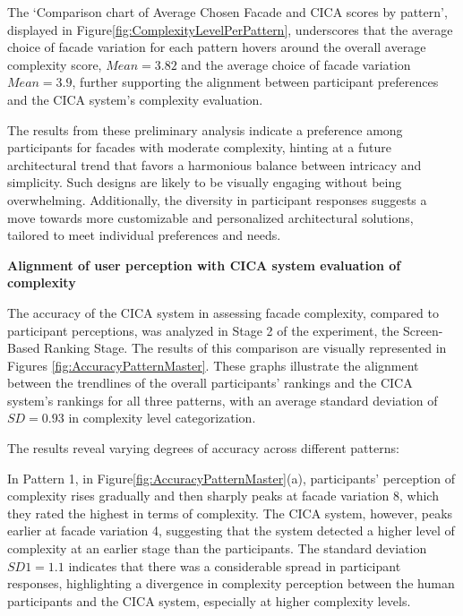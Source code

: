 
The `Comparison chart of Average Chosen Facade and CICA scores by pattern', displayed in Figure\ref{fig:ComplexityLevelPerPattern}, underscores that the average choice of facade variation for each pattern hovers around the overall average complexity score, \(Mean = 3.82\) and the average choice of facade variation \(Mean = 3.9\), further supporting the alignment between participant preferences and the CICA system's complexity evaluation.


The results from these preliminary analysis indicate a preference among participants for facades with moderate complexity, hinting at a future architectural trend that favors a harmonious balance between intricacy and simplicity.
Such designs are likely to be visually engaging without being overwhelming.
Additionally, the diversity in participant responses suggests a move towards more customizable and personalized architectural solutions, tailored to meet individual preferences and needs.

\textbf{Alignment of user perception with CICA system evaluation of complexity}

The accuracy of the CICA system in assessing facade complexity, compared to participant perceptions, was analyzed in Stage 2 of the experiment, the Screen-Based Ranking Stage.
The results of this comparison are visually represented in Figures \ref{fig:AccuracyPatternMaster}.
These graphs illustrate the alignment between the trendlines of the overall participants' rankings and the CICA system's rankings for all three patterns, with an average standard deviation of \(SD = 0.93\) in complexity level categorization.

The results reveal varying degrees of accuracy across different patterns:

In Pattern 1, in Figure\ref{fig:AccuracyPatternMaster}(a), participants' perception of complexity rises gradually and then sharply peaks at facade variation 8, which they rated the highest in terms of complexity.
The CICA system, however, peaks earlier at facade variation 4, suggesting that the system detected a higher level of complexity at an earlier stage than the participants.
The standard deviation \(SD1 = 1.1\) indicates that there was a considerable spread in participant responses, highlighting a divergence in complexity perception between the human participants and the CICA system, especially at higher complexity levels.

